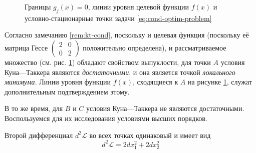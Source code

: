 \documentclass{article}
\newcommand{\La}{\mathcal{L}}
\theoremstyle{remark}
\theoremstyle{definition}
\numberwithin{equation}{section}
\begin{document}
\begin{figure}[!h]
  \centering
  \caption{Границы $g_j(x)=0$, линии уровня
    целевой функции $f(x)$ и условно-стационарные точки задачи
    \eqref{eq:cond-optim-problem}}
  \label{fig:cond-optim}
\end{figure}

Согласно замечанию \ref{rem:kt-cond}, поскольку и целевая функция
(поскольку её матрица Гессе $\left( \begin{smallmatrix}2 & 0 \\ 0 &
    2\end{smallmatrix} \right)$ положительно определена), и
рассматриваемое множество (см. рис. \ref{fig:cond-optim}) обладают
свойством выпуклости, для точки $A$ условия Куна—Таккера являются
\emph{достаточными}, и она является точкой \emph{локального минимума}.
Линии уровня функции $f(x)$, сходящиеся к $A$ на рисунке
\ref{fig:cond-optim}, служат дополнительным подтверждением этому.

В то же время, для $B$ и $C$ условия Куна—Таккера не являются
достаточными. Воспользуемся для их исследования условиями высших
порядков.

Второй дифференциал $d^2\La$ во всех точках одинаковый и имеет вид
\begin{equation}
  \label{eq:la-diff}
  d^2\La = 2dx_1^2 + 2 dx_2^2
\end{equation}
\end{document}
